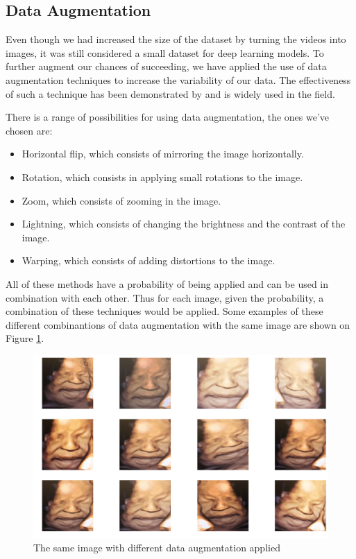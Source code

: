 \subsection{Data Augmentation}

Even though we had increased the size of the dataset by turning the videos into images, it was still considered a small dataset for deep learning models. To further augment our chances of succeeding, we have applied the use of data augmentation techniques to increase the variability of our data. The effectiveness of such a technique has been demonstrated by \cite{abs-1712-04621} and is widely used in the field.

There is a range of possibilities for using data augmentation, the ones we've chosen are:

\begin{itemize}
    \item Horizontal flip, which consists of mirroring the image horizontally. 
    \item Rotation, which consists in applying small rotations to the image.
    \item Zoom, which consists of zooming in the image.
    \item Lightning, which consists of changing the brightness and the contrast of the image.
    \item Warping, which consists of adding distortions to the image. 
\end{itemize}

All of these methods have a probability of being applied and can be used in combination with each other. Thus for each image, given the probability, a combination of these techniques would be applied. Some examples of these different combinantions of data augmentation with the same image are shown on Figure \ref{fig:data_augmentation}.

\begin{figure}[h!tp]
    \centering
    \includegraphics[width=.9\textwidth]{imgs/chap3_data_augmentation.png}
    \caption{The same image with different data augmentation applied}
    \label{fig:data_augmentation}
\end{figure}

